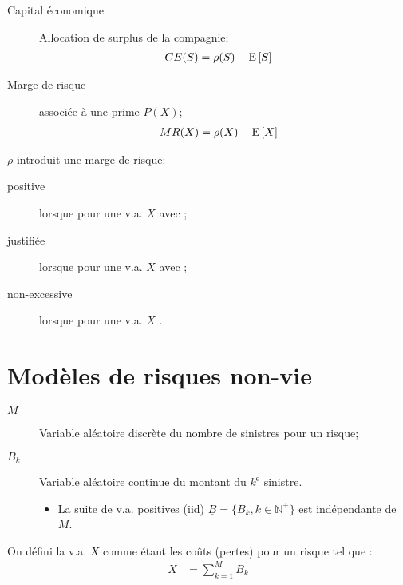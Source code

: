 \documentclass[10pt, french]{article}
\begin{document}
\begin{multicols*}{2}
\begin{description}
	\item[Capital économique]	Allocation de surplus de la compagnie;
		\begin{align*}
		CE(S)	
		&=	\rho(S)	-	\mathrm{E} \left[ S \right]
		\end{align*}
	\item[Marge de risque]	associée à une prime $P(X)$;
		\begin{align*}
		MR(X)
		&=	\rho(X)	-	\mathrm{E} \left[ X \right]
		\end{align*}
\end{description}

$\rho$ introduit une marge de risque:
\begin{description}
	\item[positive]	lorsque  pour une v.a. $X$ avec ;
	\item[justifiée]	lorsque  pour une v.a. $X$ avec ;
	\item[non-excessive]	lorsque  pour une v.a. $X$  .
\end{description}

\pagebreak
\section{Modèles de risques non-vie}
\begin{distributions}[Notation]
\begin{description}
	\item[$M$]	Variable aléatoire discrète du nombre de sinistres pour un risque;
	\item[$B_{k}$]	Variable aléatoire continue du montant du $k^{\text{e}}$ sinistre.
		\begin{itemize}
		\item	La suite de v.a. positives (iid) $\underline{B}	=	\{B_{k}, k \in \mathbb{N}^{+}\}$ est indépendante de $M$.
		\end{itemize}
\end{description}
\end{distributions}

\begin{definitionNOHFILL}
On défini la v.a. $X$ comme étant les coûts (pertes) pour un risque tel que :
\begin{align*}
	X
	&=	\sum_{k	=	1}^{M} B_{k}
\end{align*}


\end{definitionNOHFILL}
\end{multicols*}
\end{document}
